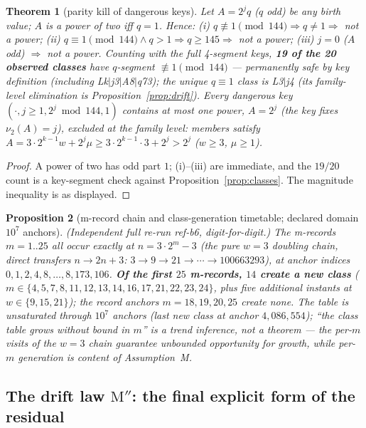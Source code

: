 \documentclass[11pt]{amsart}
\newtheorem{theorem}{Theorem}[section]
\newtheorem{proposition}[theorem]{Proposition}
\theoremstyle{definition}
\newcommand{\vtwo}[1]{\nu_2(#1)}
\begin{document}
\begin{theorem}[parity kill of dangerous keys]\label{thm:parity}
Let $A=2^{j}q$ ($q$ odd) be any birth value; $A$ is a power of two iff $q=1$.
Hence: (i) $q\not\equiv1\pmod{144}\Rightarrow q\ne1\Rightarrow$ not a power;
(ii) $q\equiv1\pmod{144}\wedge q>1\Rightarrow q\ge145\Rightarrow$ not a power;
(iii) $j=0$ ($A$ odd) $\Rightarrow$ not a power. Counting with the full
4-segment keys, \textbf{19 of the 20 observed classes} have $q$-segment
$\not\equiv1\pmod{144}$ --- \emph{permanently safe by key definition}
(including Lk$|$j3$|$A8$|$q73); the unique $q\equiv1$ class is L3$|$j4 (its
family-level elimination is Proposition~\ref{prop:drift}). Every dangerous
key $(\cdot,j\ge1,2^j\bmod144,1)$ contains at most one power, $A=2^j$ (the
key fixes $\vtwo{A}=j$), excluded at the family level: members satisfy
$A=3\cdot2^{k-1}w+2^{j}\mu\ge3\cdot2^{k-1}\cdot3+2^{j}>2^{j}$ ($w\ge3$,
$\mu\ge1$).
\end{theorem}
\begin{proof}
A power of two has odd part $1$; (i)--(iii) are immediate, and the $19/20$
count is a key-segment check against Proposition~\ref{prop:classes}. The
magnitude inequality is as displayed.
\end{proof}

\begin{proposition}[m-record chain and class-generation timetable; declared
domain $10^{7}$ anchors]\label{prop:mrecords}
(Independent full re-run ref-b6, digit-for-digit.) The m-records $m=1..25$
all occur exactly at $n=3\cdot2^{m}-3$ (the pure $w=3$ doubling chain, direct
transfers $n\to2n{+}3$: $3\to9\to21\to\cdots\to100663293$), at anchor indices
$0,1,2,4,8,\dots,8{,}173{,}106$. \textbf{Of the first $25$ m-records, $14$
create a new class} ($m\in\{4,5,7,8,11,12,13,14,16,17,21,22,23,24\}$, plus
five additional instants at $w\in\{9,15,21\}$); the record anchors
$m=18,19,20,25$ create none. The table is unsaturated through $10^{7}$
anchors (last new class at anchor $4{,}086{,}554$); \emph{``the class table
grows without bound in $m$'' is a trend inference, not a theorem} --- the
per-$m$ visits of the $w=3$ chain guarantee unbounded \emph{opportunity} for
growth, while per-$m$ generation is content of Assumption~M.
\end{proposition}

\subsection{The drift law $\mathrm{M''}$: the final
explicit form of the residual}
\end{document}
